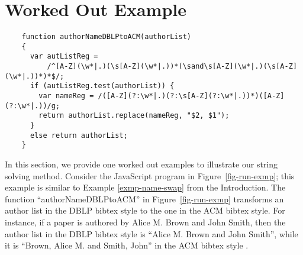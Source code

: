 
\section{Worked Out Example}\label{sec:mot}


\begin{figure*}[htbp]
\begin{center}
{
\small
\begin{verbatim}
    function authorNameDBLPtoACM(authorList)
    {
      var autListReg = 
          /^[A-Z](\w*|.)(\s[A-Z](\w*|.))*(\sand\s[A-Z](\w*|.)(\s[A-Z](\w*|.))*)*$/;
      if (autListReg.test(authorList)) {
        var nameReg = /([A-Z](?:\w*|.)(?:\s[A-Z](?:\w*|.))*)([A-Z](?:\w*|.))/g;
        return authorList.replace(nameReg, "$2, $1");
      }
      else return authorList;
    }
\end{verbatim}
}
\end{center}
\caption{Change the author list from the DBLP format to the ACM format}
\label{fig-run-exmp}
\end{figure*}



In this section, we provide one worked out examples to illustrate our string
solving method. 
Consider the JavaScript program in Figure~\ref{fig-run-exmp}; this example is
similar to Example \ref{exmp-name-swap} from the Introduction.
The function ``authorNameDBLPtoACM'' in 
Figure~\ref{fig-run-exmp} transforms %
an author list in the DBLP bibtex style to the one in the ACM bibtex style. For instance,  if a paper is authored by Alice M. Brown and John Smith, then the author list in the DBLP bibtex style is ``Alice M. Brown and John Smith'', while it is ``Brown, Alice M. and Smith, John'' in the ACM bibtex style . 

